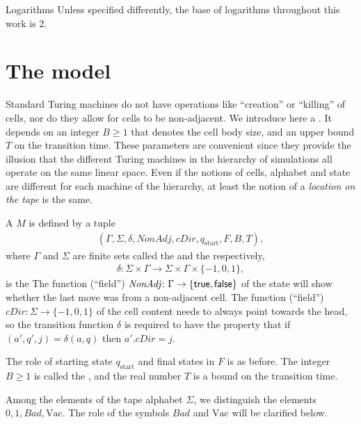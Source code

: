 \documentclass[12pt]{memoir}
\newcommand{\fld}[1]{\ensuremath{\textit{#1}}}
\renewcommand{\B}{B}
\newcommand{\Bad}{\mathit{Bad}}
\newcommand{\Tu}{T}
\newcommand{\cDir}{\fld{cDir}}
\renewcommand{\G}{\fld{NonAdj}} %
\newcommand{\start}{\mathrm{start}}
\newcommand{\Vacant}{\mathrm{Vac}}
\begin{document}
\begin{flushdescription}
\item[Logarithms] Unless specified differently,
the base of logarithms throughout this work is 2.

\end{flushdescription}


\section{The model}

Standard Turing machines do not have
operations like ``creation'' or ``killing'' of cells, nor
do they allow for cells to be non-adjacent.
We introduce here a .
It depends on an integer $\B \ge 1$ that denotes the cell body size,
and an upper bound $\Tu$ on the transition time.
These parameters are convenient since they provide the illusion that the different Turing
machines in the hierarchy of simulations all operate on the same linear space.
Even if the notions of cells, alphabet
and state are different for each machine of the hierarchy, 
at least the notion of a \emph{location
on the tape} is the same.


\begin{definition}\label{def:gen-TM}
    A  $M$ is defined by a tuple
        \begin{align}\label{eq:gen-TM}
             (\Gamma, \Sigma, \delta, \G, \cDir, q_{\start},F, \B, \Tu),
       \end{align}
    where $\Gamma$ and $\Sigma$ are finite sets
    called the  and the  respectively,
        \begin{align*}
             \delta: \Sigma\times \Gamma
             \to \Sigma\times \Gamma\times\{-1,0,1\},
        \end{align*}
    is the 
The function (``field'') \( \G\colon\Gamma\to\{\true,\false\} \) of the state will show whether
the last move was from a non-adjacent cell.
The function (``field'') \( \cDir\colon\Sigma\to\{-1,0,1\} \) of the cell content
needs to always point towards the head, so 
the transition function \( \delta \) is required to have the property that
if \( (a',q',j)=\delta(a,q) \) then \( a'.\cDir=j \).

The role of starting state $q_{\start}$ and final states in \( F \) is as before.
The integer $\B\ge 1$ is called the ,
and the real number $\Tu$ is a bound on the transition time.

Among the elements of the tape alphabet $\Sigma$, 
we distinguish the elements $0,1,\Bad,\Vacant$.
The role of the symbols $\Bad$ and \( \Vacant \) will be clarified below.
\end{definition}
\end{document}
